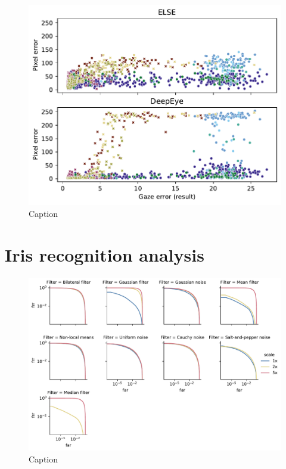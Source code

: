 \begin{figure}
    \centering
    \includegraphics[width=1\linewidth]{figures/dist.pdf}
    \caption{Caption}
    \label{fig:dist}
\end{figure}

\section{Iris recognition analysis}
\begin{figure}
    \centering
    \includegraphics[width=1\linewidth]{figures/iris-comp.pdf}
    \caption{Caption}
    \label{fig:iris-comp}
\end{figure}